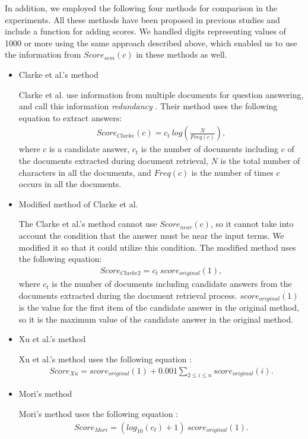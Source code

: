 In addition, we employed the following four methods for comparison in the experiments. 
All these methods have been proposed in previous studies and include a function for adding scores. 
We handled digits representing values of 1000 or more 
using the same approach described above, 
which enabled us to use the information from $Score_{sem}(c)$ in these methods as well.
\begin{itemize}
\item 
Clarke et al.'s method

Clarke et al. use information from multiple documents for question answering, 
and call this information {\it redundancy} \cite{Charles}. 
Their method uses the following equation to extract answers:
  \begin{eqnarray}
    \label{eqn:Clarke1}
    Score_{Clarke}(c) = \displaystyle c_t \ log(\frac{N}{Freq(c)}),
  \end{eqnarray}
where $c$ is a candidate answer, $c_t$ is the number of documents 
including $c$ of the documents extracted during document retrieval, 
$N$ is the total number of characters in all the documents, 
and $Freq(c)$ is the number of times $c$ occurs in all the documents. 

\item 
Modified method of Clarke et al.

The Clarke et al.'s method cannot use $Score_{near}(c)$, so
it cannot take into account the condition that the answer must be near the input terms. 
We modified it so that it could utilize this condition. 
The modified method uses the following equation: 
  \begin{eqnarray}
    \label{eqn:Clarke2}
    Score_{Clarke2} = \displaystyle c_t \ score_{original}(1),
  \end{eqnarray}
where $c_t$ is the number of documents 
including candidate answers from the documents extracted during the document retrieval process. 
$score_{original}(1)$ is the value for the first item of the candidate answer in the original method, 
so it is the maximum value of the candidate answer in the original method. 

\item 
Xu et al.'s method

Xu et al.'s method uses the following equation \cite{Xu2003}: 
  \begin{eqnarray}
    \label{eqn:Xu}
    Score_{Xu} = \displaystyle score_{original}(1) + 0.001 \sum_{2 \leq i \leq n} score_{original}(i).
  \end{eqnarray}

\item 
Mori's method

Mori's method uses the following equation \cite{Mori_ntcir4_qa}: 
  \begin{eqnarray}
    \label{eqn:Mori}
    Score_{Mori} = \displaystyle (log_{10}(c_t)+1) \ score_{original}(1).
  \end{eqnarray}

\end{itemize}


